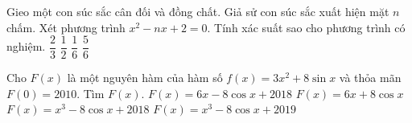\begin{ex}%
	Gieo một con súc sắc cân đối và đồng chất. Giả sử con súc sắc xuất hiện mặt $n$ chấm. Xét phương trình $x^2-nx+2=0$. Tính xác suất sao cho phương trình có nghiệm.
	\choice
	{\True $\dfrac{2}{3}$}
	{$\dfrac{1}{2}$}
	{$\dfrac{1}{6}$}
	{$\dfrac{5}{6}$}
\end{ex}

\begin{ex}%
	Cho $F(x)$ là một nguyên hàm của hàm số $f(x)=3x^2+8\sin x$ và thỏa mãn $F(0)=2010$. Tìm $F(x)$.
	\choice
	{$F(x)=6x-8\cos x+2018$}
	{$F(x)=6x+8\cos x$}
	{\True $F(x)=x^3-8\cos x+2018$}
	{$F(x)=x^3-8\cos x+2019$}
\end{ex}

